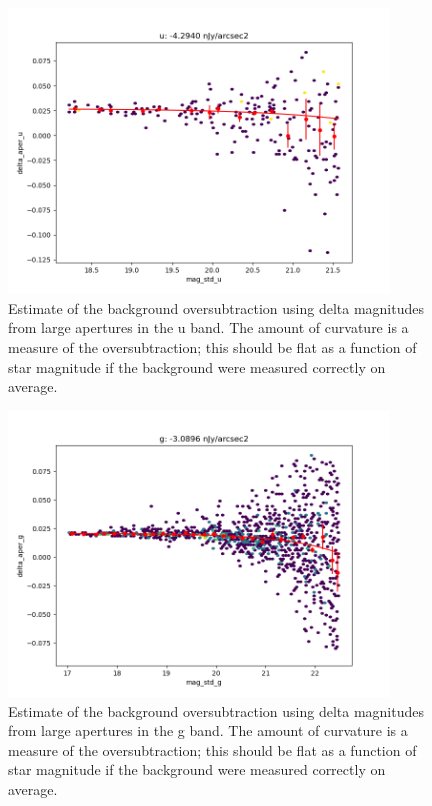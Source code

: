 \begin{figure}
  \begin{center}
    \includegraphics[width=0.9\textwidth]{photometric_calibration_figures/background_oversubtraction_u.png}
  \end{center}
  \caption{Estimate of the background oversubtraction using delta magnitudes
    from large apertures in the u band.  The amount of curvature is a measure
    of the oversubtraction; this should be flat as a function of star magnitude
    if the background were measured correctly on average.}
\end{figure}

\begin{figure}
  \begin{center}
    \includegraphics[width=0.9\textwidth]{photometric_calibration_figures/background_oversubtraction_g.png}
  \end{center}
  \caption{Estimate of the background oversubtraction using delta magnitudes
    from large apertures in the g band.  The amount of curvature is a measure
    of the oversubtraction; this should be flat as a function of star magnitude
    if the background were measured correctly on average.}
\end{figure}

